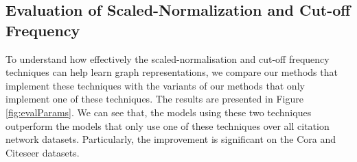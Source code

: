 \documentclass{article}
\begin{document}
\subsection{Evaluation of Scaled-Normalization and Cut-off Frequency}
\begin{comment}
\begin{wraptable}{r}{0.45\textwidth}
\resizebox{0.45\columnwidth}{!}{\begin{tabular}{|c| l| c c c|} 
\specialrule{.1em}{.05em}{.05em} 
Case & Model & Cora & Citeseer & Pubmed \\ [0.5ex] 
\hline 
\multirow{3}{*}{1} & DFNet & \textbf{85.2} & \textbf{74.2} & \textbf{84.3} \\ 
& DFNet-ATT & \textbf{86.0} & \textbf{74.7} & \textbf{85.2} \\ 
& DF-ATT & \textbf{83.4} & \textbf{73.1} & \textbf{82.3} \\ 
\hline 
\multirow{3}{*}{2} & DFNet & 46.6 & 33.2 & 82.8 \\ 
& DFNet-ATT & 45.1 & 47.2 & 81.1 \\ 
& DF-ATT & 73.9 & 58.5 & 71.8 \\ 
\hline 
\multirow{3}{*}{3} & DFNet & 35.6 & 28.7 & 70.2 \\ 
& DFNet-ATT & 30.9 & 25.3 & 82.4 \\ 
& DF-ATT & 76.3 & 66.5 & 81.3 \\ 
\specialrule{.1em}{.05em}{.05em}
\end{tabular}}\caption{Accuracy (\%) of our models in three cases: (1) using both scaled-normalization and cutoff frequency, (2) not using scaled-normalization, and (3) not using cutoff frequency.  \label{Tab:normalization-cutoff}}
\end{wraptable}
\end{comment}
To understand how effectively the scaled-normalisation and cut-off frequency techniques can help learn graph representations, we compare our methods that implement these techniques with the variants of our methods that only implement one of these techniques. The results are presented in Figure \ref{fig:evalParams}. We can see that, the models using these two techniques outperform the models that only use one of these techniques over all citation network datasets. Particularly, the improvement is significant on the Cora and Citeseer datasets.
\end{document}

